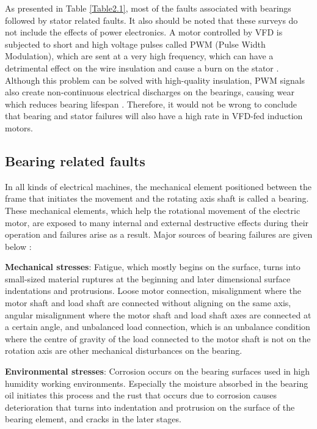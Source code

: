 As presented in Table \ref{Table2.1}, most of the faults associated with bearings followed by stator related faults. It also should be noted that these surveys do not include the effects of power electronics. A motor controlled by VFD is subjected to short and high voltage pulses called PWM (Pulse Width Modulation), which are sent at a very high frequency, which can have a detrimental effect on the wire insulation and cause a burn on the stator \cite{gunnar2016}. Although this problem can be solved with high-quality insulation, PWM signals also create non-continuous electrical discharges on the bearings, causing wear which reduces bearing lifespan \cite{trigeassou2013electrical}. Therefore, it would not be wrong to conclude that bearing and stator failures will also have a high rate in VFD-fed induction motors.

\subsection{Bearing related faults}

In all kinds of electrical machines, the mechanical element positioned between the frame that initiates the movement and the rotating axis shaft is called a bearing. These mechanical elements, which help the rotational movement of the electric motor, are exposed to many internal and external destructive effects during their operation and failures arise as a result. Major sources of bearing failures are given below \cite{zhang2010survey,easa,skf,schoen1995motor,en201320958,bonnet2010}:

\textbf{Mechanical stresses}: Fatigue, which mostly begins on the surface, turns into small-sized material ruptures at the beginning and later dimensional surface indentations and protrusions. Loose motor connection, misalignment where the motor shaft and load shaft are connected without aligning on the same axis, angular misalignment where the motor shaft and load shaft axes are connected at a certain angle, and unbalanced load connection, which is an unbalance condition where the centre of gravity of the load connected to the motor shaft is not on the rotation axis are other mechanical disturbances on the bearing.

\textbf{Environmental stresses}: Corrosion occurs on the bearing surfaces used in high humidity working environments. Especially the moisture absorbed in the bearing oil initiates this process and the rust that occurs due to corrosion causes deterioration that turns into indentation and protrusion on the surface of the bearing element, and cracks in the later stages.

